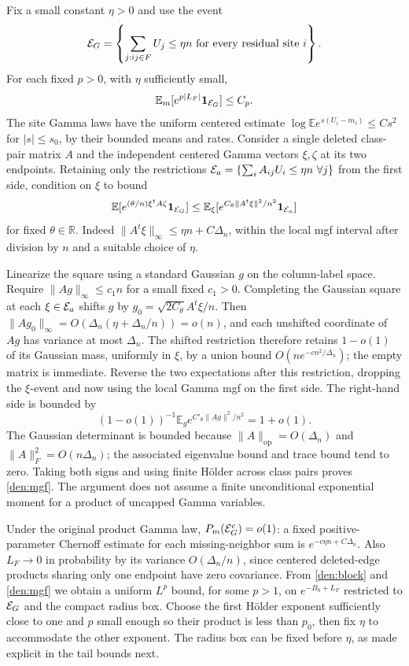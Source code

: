 Fix a small constant \(\eta>0\) and use the event
\begin{equation}\label{den:admissible}
 {\cal E}_G=\left\{\sum_{j:ij\in F}U_j\le\eta n
                         \text{ for every residual site }i\right\}.
\end{equation}
For each fixed \(p>0\), with \(\eta\) sufficiently small,
\begin{equation}\label{den:mgf}
 \mathbb E_m[e^{p|L_F|}\mathbf 1_{{\cal E}_G}]\le C_p .
\end{equation}
The site Gamma laws have the uniform centered estimate
\(\log\mathbb E e^{s(U_i-m_i)}\le C s^2\) for \(|s|\le s_0\), by their bounded means and rates. Consider a single deleted class-pair matrix \(A\) and the independent centered Gamma vectors \(\xi,\zeta\) at its two endpoints. Retaining only the restrictions \({\cal E}_a=\{\sum_i A_{ij} U_i\le\eta n\ \forall j\}\) from the first side, condition on \(\xi\) to bound
\[
 \mathbb E[e^{(\theta/n)\xi^t A\zeta}\mathbf 1_{{\cal E}_G}]
 \le \mathbb E_\xi[e^{C_\theta\|A^t\xi\|^2/n^2}\mathbf 1_{{\cal E}_a}]
\]
for fixed \(\theta\in\mathbb R\). Indeed \(\|A^t\xi\|_\infty\le\eta n+C\Delta_n\), within the local mgf interval after division by \(n\) and a suitable choice of \(\eta\).

Linearize the square using a standard Gaussian \(g\) on the column-label space. Require \(\|Ag\|_\infty\le c_1n\) for a small fixed \(c_1>0\). Completing the Gaussian square at each \(\xi\in{\cal E}_a\) shifts \(g\) by \(g_0=\sqrt{2C_\theta}A^t\xi/n\). Then \(\|Ag_0\|_\infty=O(\Delta_n(\eta+\Delta_n/n))=o(n)\), and each unshifted coordinate of \(Ag\) has variance at most \(\Delta_n\). The shifted restriction therefore retains \(1-o(1)\) of its Gaussian mass, uniformly in \(\xi\), by a union bound \(O(n e^{-c n^2/\Delta_n})\); the empty matrix is immediate. Reverse the two expectations after this restriction, dropping the \(\xi\)-event and now using the local Gamma mgf on the first side. The right-hand side is bounded by
\[
 (1-o(1))^{-1}\mathbb E_g e^{C'_\theta\|Ag\|^2/n^2}=1+o(1).
\]
The Gaussian determinant is bounded because \(\|A\|_{\mathrm{op}}=O(\Delta_n)\) and \(\|A\|_F^2=O(n\Delta_n)\); the associated eigenvalue bound and trace bound tend to zero. Taking both signs and using finite H\"older across class pairs proves \eqref{den:mgf}. The argument does not assume a finite unconditional exponential moment for a product of uncapped Gamma variables.

Under the original product Gamma law, \(P_m({\cal E}_G^c)=o(1)\): a fixed positive-parameter Chernoff estimate for each missing-neighbor sum is \(e^{-c\eta n+C\Delta_n}\). Also \(L_F\to0\) in probability by its variance \(O(\Delta_n/n)\), since centered deleted-edge products sharing only one endpoint have zero covariance. From \eqref{den:block} and \eqref{den:mgf} we obtain a uniform \(L^p\) bound, for some \(p>1\), on \(e^{-B_0+L_F}\) restricted to \({\cal E}_G\) and the compact radius box. Choose the first H\"older exponent sufficiently close to one and \(p\) small enough so their product is less than \(p_0\), then fix \(\eta\) to accommodate the other exponent. The radius box can be fixed before \(\eta\), as made explicit in the tail bounds next.

